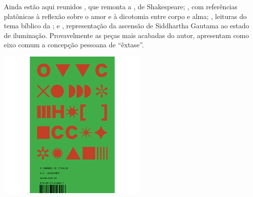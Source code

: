 Ainda estão aqui reunidos {}, que remonta a {}, de Shakespeare; {}, com referências platônicas à reflexão sobre o amor e à dicotomia entre corpo e alma; {}, leituras do
tema bíblico da {}; e {}, representação da ascensão de Siddhartha Gautama ao estado de iluminação. Provavelmente as peças mais acabadas do autor, apresentam como eixo comum a concepção pessoana de ``êxtase''. 
%

\vfill

\hspace*{-.4cm}\begin{minipage}[c]{.5\linewidth}
\small{
{}}
\end{minipage}


\pagebreak


\begin{center}
\hspace*{-3.6cm}
\hspace*{3.1cm}\includegraphics[width=74mm]{./grid/lovecraft.png}
\end{center}

\hspace*{-7cm}\hrulefill\hspace*{-7cm}


